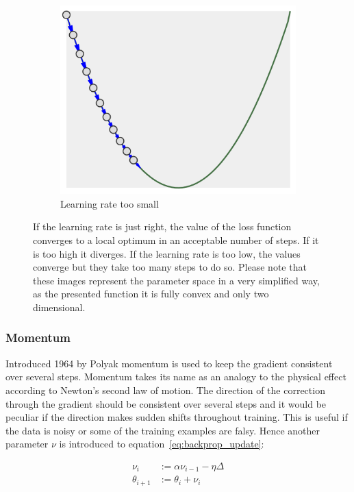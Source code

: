 \begin{figure}
\begin{subfigure}[b]{0.3\textwidth}
        \includegraphics[width=\textwidth]{images/lr_too_low.png}
        \caption{Learning rate too small}
        \label{fig:lr_too-low}
    \end{subfigure}
    \caption{If the learning rate is just right, the value of the loss function converges to a local optimum in an acceptable number of steps.
    If it is too high it diverges.
    If the learning rate is too low, the values converge but they take too many steps to do so.
    Please note that these images represent the parameter space in a very simplified way, as the presented function it is fully convex and only two dimensional.}
    \label{fig:learning_rate}
\end{figure}

\subsubsection{Momentum}

Introduced 1964 by Polyak \cite{Polyak1964} momentum is used to keep the gradient consistent over several steps.
Momentum takes its name as an analogy to the physical effect according to Newton's second law of motion.
The direction of the correction through the gradient should be consistent over several steps and it would be peculiar if the direction makes sudden shifts throughout training.
This is useful if the data is noisy or some of the training examples are falsy.
Hence another parameter $\nu$ is introduced to equation~\eqref{eq:backprop_update}:

\begin{equation}
    \begin{split}
        \nu_{i} &:= \alpha \nu_{i-1} - \eta \varDelta \\
        \theta_{i+1} &:= \theta_i + \nu_i
    \end{split}
    \label{eq:momentum}
\end{equation}


